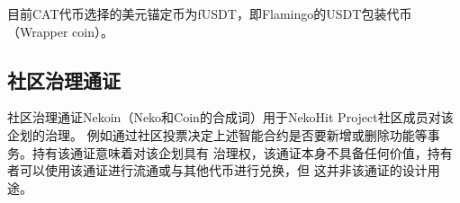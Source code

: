 目前CAT代币选择的美元锚定币为fUSDT，即Flamingo的USDT包装代币（Wrapper coin）。

\subsection{社区治理通证}\label{subsec:nekoin}

社区治理通证Nekoin（Neko和Coin的合成词）用于NekoHit Project社区成员对该企划的治理。
例如通过社区投票决定上述智能合约是否要新增或删除功能等事务。持有该通证意味着对该企划具有
治理权，该通证本身不具备任何价值，持有者可以使用该通证进行流通或与其他代币进行兑换，但
这并非该通证的设计用途。
